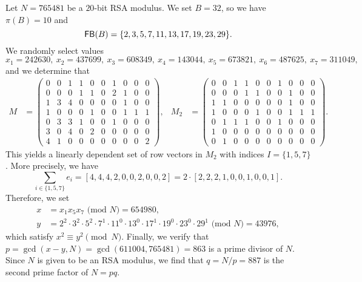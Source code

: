 \begin{exmp}
    Let $N = 765481$ be a $20$-bit RSA modulus. We set $B = 32$, so we have 
    $\pi(B) = 10$ and 
    \[ {\sf FB}(B) = \{2, 3, 5, 7, 11, 13, 17, 19, 23, 29\}. \] 
    We randomly select values 
    \[ x_1 = 242630,\
    x_2 = 437699,\
    x_3 = 608349,\
    x_4 = 143044,\
    x_5 = 673821,\
    x_6 = 487625,\
    x_7 = 311049, \] 
    and we determine that 
    \begin{align*}
        M &= \begin{pmatrix}
            0&0&1&1&0&0&1&0&0&0\\
            0&0&0&1&1&0&2&1&0&0\\
            1&3&4&0&0&0&0&1&0&0\\
            1&0&0&0&1&0&0&1&1&1\\
            0&3&3&1&0&0&1&0&0&0\\
            3&0&4&0&2&0&0&0&0&0\\
            4&1&0&0&0&0&0&0&0&2
        \end{pmatrix}, &  
        M_2 &= \begin{pmatrix}
            0&0&1&1&0&0&1&0&0&0\\
            0&0&0&1&1&0&0&1&0&0\\
            1&1&0&0&0&0&0&1&0&0\\
            1&0&0&0&1&0&0&1&1&1\\
            0&1&1&1&0&0&1&0&0&0\\
            1&0&0&0&0&0&0&0&0&0\\
            0&1&0&0&0&0&0&0&0&0
        \end{pmatrix}. 
    \end{align*}
    This yields a linearly dependent set of row vectors in $M_2$ with 
    indices $I = \{1, 5, 7\}$. More precisely, we have 
    \[ \sum_{i\in\{1, 5, 7\}} e_i = [4, 4, 4, 2, 0, 0, 2, 0, 0, 2] 
    = 2 \cdot [2, 2, 2, 1, 0, 0, 1, 0, 0, 1]. \] 
    Therefore, we set 
    \begin{align*} 
        x &= x_1x_5x_7 \text{ (mod $N$)} = 654980, \\ 
        y &= 2^2 \cdot 3^2 \cdot 5^2 \cdot 7^1 \cdot 11^0 \cdot 13^0 
        \cdot 17^1 \cdot 19^0 \cdot 23^0 \cdot 29^1 \text{ (mod $N$)} 
        = 43976, 
    \end{align*}
    which satisfy $x^2 \equiv y^2 \pmod N$. Finally, we verify that 
    $p = \gcd(x-y, N) = \gcd(611004, 765481) = 863$ is a prime divisor of $N$. 
    Since $N$ is given to be an RSA modulus, we find that $q = N/p = 887$ is 
    the second prime factor of $N = pq$. 
\end{exmp}

